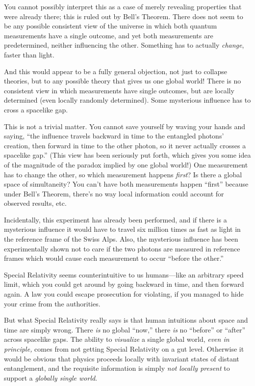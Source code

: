 {
 You cannot possibly interpret this as a case of merely revealing
properties that were already there; this is ruled out by
Bell's Theorem. There does not seem to be any possible
consistent view of the universe in which both quantum measurements have
a single outcome, and yet both measurements are predetermined, neither
influencing the other. Something has to actually \textit{change},
faster than light.}

{
 And this would appear to be a fully general objection, not just to
collapse theories, but to any possible theory that gives us one global
world! There is no consistent view in which measurements have single
outcomes, but are locally determined (even locally randomly
determined). Some mysterious influence has to cross a spacelike gap.}

{
 This is not a trivial matter. You cannot save yourself by waving
your hands and saying, ``the influence travels
backward in time to the entangled photons' creation,
then forward in time to the other photon, so it never actually crosses
a spacelike gap.'' (This view has been seriously put
forth, which gives you some idea of the magnitude of the paradox
implied by one global world!) One measurement has to change the other,
so which measurement happens \textit{first}? Is there a global space of
simultaneity? You can't have both measurements happen
``first'' because under
Bell's Theorem, there's no way local
information could account for observed results, etc.}

{
 Incidentally, this experiment has already been performed, and if
there is a mysterious influence it would have to travel six million
times as fast as light in the reference frame of the Swiss Alps. Also,
the mysterious influence has been experimentally shown not to care if
the two photons are measured in reference frames which would cause each
measurement to occur ``before the
other.''}

{
 Special Relativity seems counterintuitive to us humans---like an
arbitrary speed limit, which you could get around by going backward in
time, and then forward again. A law you could escape prosecution for
violating, if you managed to hide your crime from the authorities.}

{
 But what Special Relativity really says is that human intuitions
about space and time are simply wrong. There \textit{is} no global
``now,'' there \textit{is} no
``before'' or
``after'' across spacelike gaps. The
ability to \textit{visualize} a single global world, \textit{even in
principle,} comes from not getting Special Relativity on a gut level.
Otherwise it would be obvious that physics proceeds locally with
invariant states of distant entanglement, and the requisite information
is simply \textit{not} \textit{locally present} to support a
\textit{globally single world}.}

